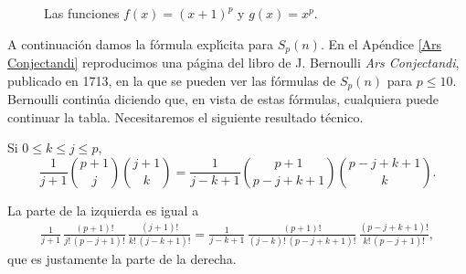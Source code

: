 \begin{figure}
\begin{center}
\end{center}
\caption{\label{funciones} Las funciones $f(x)=(x+1)^p$ y $g(x)=x^p$.}
\end{figure}

A continuaci\'on damos la f\'ormula expl\'\i cita para $S_p(n)$. En el Ap\'endice \ref{Ars Conjectandi} reproducimos una p\'agina del libro de J. Bernoulli \emph{Ars Conjectandi}, publicado en 1713, en la que se pueden ver las f\'ormulas de $S_p(n)$ para $p\leq 10$. Bernoulli contin\'ua diciendo que, en vista de estas f\'ormulas, cualquiera puede continuar la tabla. Necesitaremos el siguiente resultado t\'ecnico.

\begin{lema} Si $0\leq k\leq j\leq p$,
$$\frac{1}{j+1}{p+1\choose j}{j+1\choose k}=\frac{1}{j-k+1}{p+1\choose p-j+k+1}{p-j+k+1\choose k}.$$\end{lema}

\begin{demostracion}
La parte de la izquierda es igual a
\begin{eqnarray*}&\frac{1}{j+1}\,\frac{(p+1)!}{j!\,(p-j+1)!}\,\frac{(j+1)!}{k!\,(j-k+1)!}
=\frac{1}{j-k+1}\,\frac{(p+1)!}{(j-k)!\,(p-j+k+1)!}\,\frac{(p-j+k+1)!}{k!\,(p-j+1)!},&
\end{eqnarray*}
que es justamente la parte de la derecha.
\end{demostracion}

